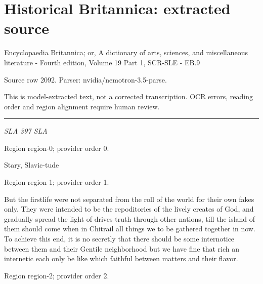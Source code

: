 \documentclass[11pt]{article}
\begin{document}
\section*{Historical Britannica: extracted source}
Encyclopaedia Britannica; or, A dictionary of arts, sciences, and miscellaneous literature - Fourth edition, Volume 19 Part 1, SCR-SLE - EB.9\par
{\small Source row 2092. Parser: nvidia/nemotron-3.5-parse.\par}
{\small This is model-extracted text, not a corrected transcription. OCR errors, reading order and region alignment require human review.\par}
\hrule\medskip
{\small\itshape SLA 397 SLA\par}

{\scriptsize\color{gray} Region region-0; provider order 0.\par}
\medskip

Stary, Slavic-tude
\par

{\scriptsize\color{gray} Region region-1; provider order 1.\par}
\medskip

But the firstlife were not separated from the roll of the world for their own fakes only. They were intended to be the repoditories of the lively creates of God, and gradually spread the light of drives truth through other nations, till the island of them should come when in Chitrail all things we to be gathered together in now. To achieve this end, it is no secretly that there should be some internotice between them and their Gentile neighborhood but we have fine that rich an internetic each only be like which faithful between matters and their flavor.
\par

{\scriptsize\color{gray} Region region-2; provider order 2.\par}
\medskip
\end{document}
